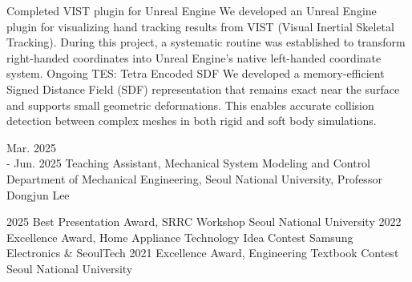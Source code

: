 \documentclass[9pt]{developercv} %
\begin{document}
\begin{entrylist}
    \entry
		{Completed}
		{VIST plugin for Unreal Engine}
		{}
		{We developed an Unreal Engine plugin for visualizing hand tracking results from VIST (Visual Inertial Skeletal Tracking). During this project, a systematic routine was established to transform right-handed coordinates into Unreal Engine’s native left-handed coordinate system.
        }
    \entry
        {Ongoing}
		{TES: Tetra Encoded SDF}
		{}
		{We developed a memory-efficient Signed Distance Field (SDF) representation that remains exact near the surface and supports small geometric deformations. This enables accurate collision detection between complex meshes in both rigid and soft body simulations.
        }
\end{entrylist}

\vspace{-10 pt}
\begin{entrylist}
	\entry
        {Mar. 2025\\ - Jun. 2025}
		{Teaching Assistant, Mechanical System Modeling and Control}
		{}
		{Department of Mechanical Engineering, Seoul National University, Professor Dongjun Lee}
\end{entrylist}

\begin{entrylist}
    \entry
        {2025}
        {Best Presentation Award, SRRC Workshop}
        {Seoul National University}
        {}
    \entry
        {2022}
        {Excellence Award, Home Appliance Technology Idea Contest}
        {Samsung Electronics \& SeoulTech}
        {}
    \entry
        {2021}
        {Excellence Award, Engineering Textbook Contest}
        {Seoul National University}
        {}
\end{entrylist}
\end{document}
